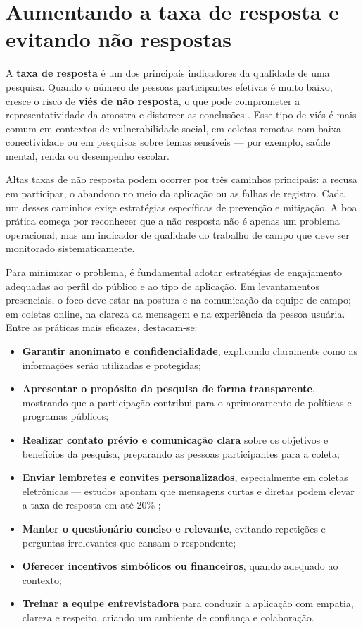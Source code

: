 \documentclass[12pt, a4paper, openany]{book}
\begin{document}
\section{Aumentando a taxa de resposta e evitando n\~ao respostas}

A \textbf{taxa de resposta} \'e um dos principais indicadores da qualidade de uma pesquisa. Quando o n\'umero de pessoas participantes efetivas \'e muito baixo, cresce o risco de \textbf{vi\'es de n\~ao resposta}, o que pode comprometer a representatividade da amostra e distorcer as conclus\~oes \citep{duflo2007using, jpal2020practical}. Esse tipo de vi\'es \'e mais comum em contextos de vulnerabilidade social, em coletas remotas com baixa conectividade ou em pesquisas sobre temas sens\'iveis --- por exemplo, sa\'ude mental, renda ou desempenho escolar.

Altas taxas de n\~ao resposta podem ocorrer por tr\^es caminhos principais: a recusa em participar, o abandono no meio da aplica\c{c}\~ao ou as falhas de registro. Cada um desses caminhos exige estrat\'egias espec\'ificas de preven\c{c}\~ao e mitiga\c{c}\~ao. A boa pr\'atica come\c{c}a por reconhecer que a n\~ao resposta n\~ao \'e apenas um problema operacional, mas um indicador de qualidade do trabalho de campo que deve ser monitorado sistematicamente.

Para minimizar o problema, \'e fundamental adotar estrat\'egias de engajamento adequadas ao perfil do p\'ublico e ao tipo de aplica\c{c}\~ao. Em levantamentos presenciais, o foco deve estar na postura e na comunica\c{c}\~ao da equipe de campo; em coletas online, na clareza da mensagem e na experi\^encia da pessoa usu\'aria. Entre as pr\'aticas mais eficazes, destacam-se:

\begin{itemize}
\item \textbf{Garantir anonimato e confidencialidade}, explicando claramente como as informa\c{c}\~oes ser\~ao utilizadas e protegidas;
\item \textbf{Apresentar o prop\'osito da pesquisa de forma transparente}, mostrando que a participa\c{c}\~ao contribui para o aprimoramento de pol\'iticas e programas p\'ublicos;
\item \textbf{Realizar contato pr\'evio e comunica\c{c}\~ao clara} sobre os objetivos e benef\'icios da pesquisa, preparando as pessoas participantes para a coleta;
\item \textbf{Enviar lembretes e convites personalizados}, especialmente em coletas eletr\^onicas --- estudos apontam que mensagens curtas e diretas podem elevar a taxa de resposta em at\'e 20\% \citep{oecd2022data};
\item \textbf{Manter o question\'ario conciso e relevante}, evitando repeti\c{c}\~oes e perguntas irrelevantes que cansam o respondente;
\item \textbf{Oferecer incentivos simb\'olicos ou financeiros}, quando adequado ao contexto;
\item \textbf{Treinar a equipe entrevistadora} para conduzir a aplica\c{c}\~ao com empatia, clareza e respeito, criando um ambiente de confian\c{c}a e colabora\c{c}\~ao.
\end{itemize}
\end{document}
